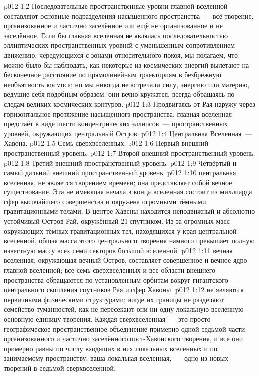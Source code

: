 \vs p012 1:2 Последовательные пространственные уровни главной вселенной составляют основные подразделения насыщенного пространства~--- всё творение, организованное и частично заселённое или ещё не организованное и не заселённое. Если бы главная вселенная не являлась последовательностью эллиптических пространственных уровней с уменьшенным сопротивлением движению, чередующихся с зонами относительного покоя, мы полагаем, что можно было бы наблюдать, как некоторые из космических энергий вылетают на бесконечное расстояние по прямолинейным траекториям в безбрежную необъятность космоса; но мы никогда не встречали силу, энергию или материю, ведущие себя подобным образом; они вечно кружатся, всегда обращаясь по следам великих космических контуров.
\vs p012 1:3 \pc Продвигаясь от Рая наружу через горизонтальное протяжение насыщенного пространства, главная вселенная предстаёт в виде шести концентрических эллипсов~--- пространственных уровней, окружающих центральный Остров:
\vs p012 1:4 Центральная Вселенная~--- Хавона.
\vs p012 1:5 Семь сверхвселенных.
\vs p012 1:6 Первый внешний пространственный уровень.
\vs p012 1:7 Второй внешний пространственный уровень.
\vs p012 1:8 Третий внешний пространственный уровень.
\vs p012 1:9 Четвёртый и самый дальний внешний пространственный уровень.
\vs p012 1:10 \pc {} центральная вселенная, не является творением времени; она представляет собой вечное существование. Эта не имеющая начала и конца вселенная состоит из миллиарда сфер высочайшего совершенства и окружена огромными тёмными гравитационными телами. В центре Хавоны находится неподвижный и абсолютно устойчивый Остров Рай, окружённый 21 спутником. Из\hyp{}за огромных масс окружающих тёмных гравитационных тел, находящихся у края центральной вселенной, общая масса этого центрального творения намного превышает полную известную массу всех семи секторов большой вселенной.
\vs p012 1:11 \pc {} вечная вселенная, окружающая вечный Остров, составляет совершенное и вечное ядро главной вселенной; все семь сверхвселенных и все области внешнего пространства обращаются по установленным орбитам вокруг гигантского центрального скопления спутников Рая и сфер Хавоны.
\vs p012 1:12  не являются первичными физическими структурами; нигде их границы не разделяют семейство туманностей, как не пересекают они ни одну локальную вселенную~--- основную единицу творения. Каждая сверхвселенная~--- это просто географическое пространственное объединение примерно одной седьмой части организованного и частично заселённого пост\hyp{}Хавонского творения, и все они примерно равны по числу входящих в них локальных вселенных и по занимаемому пространству.  ваша локальная вселенная,~--- одно из новых творений в  седьмой сверхвселенной.
